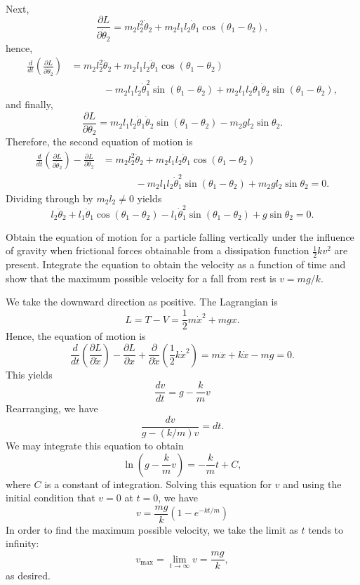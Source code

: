 \begin{questions}
\begin{solution}
\begin{align*}
\end{align*}
Next,
\[
\frac{\partial L}{\partial \dot{\theta}_2} = m_2 l_2^2 \dot{\theta}_2 + m_2 l_1 l_2 \dot{\theta}_1 \cos \left( \theta_1 - \theta_2 \right),
\]
hence,
\begin{align*}
\frac{d}{dt} \left( \frac{\partial L}{\partial \dot{\theta}_2} \right) &= m_2 l_2^2 \ddot{\theta}_2 + m_2 l_1 l_2 \ddot{\theta}_1 \cos \left( \theta_1 - \theta_2 \right) \\
&\phantom{=}\qquad - m_2 l_1 l_2 \dot{\theta}_1^2 \sin \left( \theta_1 - \theta_2 \right) + m_2 l_1 l_2 \dot{\theta}_1 \dot{\theta}_2 \sin \left( \theta_1 - \theta_2 \right),
\end{align*}
and finally,
\[
\frac{\partial L}{\partial \theta_2} = m_2 l_1 l_2 \dot{\theta}_1 \dot{\theta}_2 \sin \left( \theta_1 - \theta_2 \right) - m_2 g l_2 \sin \theta_2.
\]
Therefore, the second equation of motion is
\begin{align*}
\frac{d}{dt} \left( \frac{\partial L}{\partial \dot{\theta}_2} \right) - \frac{\partial L}{\partial \theta_2} &= m_2 l_2^2 \ddot{\theta}_2 + m_2 l_1 l_2 \ddot{\theta}_1 \cos \left( \theta_1 - \theta_2 \right) \\
&\phantom{=}\qquad - m_2 l_1 l_2 \dot{\theta}_1^2 \sin \left( \theta_1 - \theta_2 \right) + m_2 g l_2 \sin \theta_2 = 0.
\end{align*}
Dividing through by $m_2 l_2 \neq 0$ yields
\[
l_2 \ddot{\theta}_2 + l_1 \ddot{\theta}_1 \cos \left( \theta_1 - \theta_2 \right) - l_1 \dot{\theta}_1^2 \sin \left( \theta_1 - \theta_2 \right) + g \sin \theta_2 = 0.
\]
\end{solution}

\question
Obtain the equation of motion for a particle falling vertically under the influence of gravity when frictional forces obtainable from a dissipation function $\frac{1}{2} k v^2$ are present. Integrate the equation to obtain the velocity as a function of time and show that the maximum possible velocity for a fall from rest is $v = m g / k$.
\begin{solution}
We take the downward direction as positive. The Lagrangian is
\[
L = T - V = \frac{1}{2} m \dot{x}^2 + m g x.
\]
Hence, the equation of motion is
\[
\frac{d}{dt} \left( \frac{\partial L}{\partial \dot{x}} \right) - \frac{\partial L}{\partial x} + \frac{\partial}{\partial \dot{x}} \left( \frac{1}{2} k \dot{x}^2 \right) = m \ddot{x} + k \dot{x} - m g = 0.
\]
This yields
\[
\frac{dv}{dt} = g - \frac{k}{m} v
\]
Rearranging, we have
\[
\frac{dv}{g - (k / m) v} = dt.
\]
We may integrate this equation to obtain
\[
\ln \left( g - \frac{k}{m} v \right) = -\frac{k}{m} t + C,
\]
where $C$ is  a constant of integration. Solving this equation for $v$ and using the initial condition that $v = 0$ at $t = 0$, we have
\[
v = \frac{m g}{k} \left( 1 - e^{-k t / m} \right)
\]
In order to find the maximum possible velocity, we take the limit as $t$ tends to infinity:
\[
v_{\mathrm{max}} = \lim_{t \rightarrow \infty} v = \frac{m g}{k},
\]
as desired.
\end{solution}


\end{questions}
